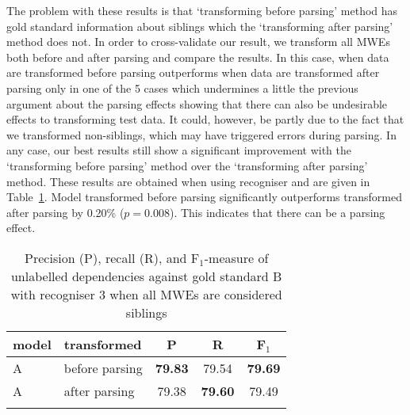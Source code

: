 \documentclass[output=paper]{langsci/langscibook}
\begin{document}
\indent The problem with these results is that `transforming before parsing' method has gold standard information about siblings which the `transforming after parsing' method does not. In order to cross-validate our result, we transform all MWEs both before and after parsing and compare the results. In this case, {\modelA} when data are transformed before parsing outperforms {\modelA} when data are transformed after parsing only in one of the 5 cases which undermines a little the previous argument about the parsing effects showing that there can also be undesirable effects to transforming test data. It could, however, be partly due to the fact that we transformed non-siblings, which may have triggered errors during parsing. In any case, our best results still show a significant improvement with the `transforming before parsing' method over the `transforming after parsing' method. These results are obtained when using recogniser and are given in Table~\ref{del:tab:res1tris}. Model transformed before parsing significantly outperforms {\modelA} transformed after parsing by 0.20\% ($p=0.008$). This indicates that there can be a parsing effect.

\begin{table}[h]
    \centering
    \begin{tabular}{l l c c c} %
      \lsptoprule
        \textnormal{model}
        & \textnormal{transformed}
        & \textnormal{P}
        & \textnormal{R}
        & \textnormal{F$_1$}
        \\ %
        \midrule
        A & before parsing &\textbf{79.83} & 79.54  & \textbf{79.69} \\
        A & after parsing &79.38  &\textbf{79.60}  & 79.49 \tabularnewline %
        \lspbottomrule
    \end{tabular}
    \caption{Precision (P), recall (R), and F$_1$-measure of unlabelled dependencies against gold standard B with recogniser 3 when all MWEs are considered siblings \label{del:tab:res1tris}}
\end{table}
\end{document}
